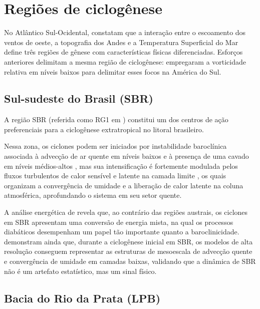 
\section{Regiões de ciclogênese}\label{sec:tb_regiones}
No Atlântico Sul-Ocidental, \citet{gramcianinov2019properties} constatam que a interação entre o escoamento dos ventos de oeste, a topografia dos Andes e a Temperatura Superficial do Mar define três regiões de gênese com características físicas diferenciadas. Esforços anteriores delimitam a mesma região de ciclogênese: \citet{reboita2010south} empregaram a vorticidade relativa em níveis baixos para delimitar esses focos na América do Sul.

\subsection{Sul-sudeste do Brasil (SBR)}\label{subsec:tb_sbr}

A região SBR (referida como RG1 em \citet{reboita2022from}) constitui um dos centros de ação preferenciais para a ciclogênese extratropical no litoral brasileiro.

Nessa zona, os ciclones podem ser iniciados por instabilidade baroclínica associada à advecção de ar quente em níveis baixos e à presença de uma cavado em níveis médios-altos \citep{gozzo2014subtropical}, mas sua intensificação é fortemente modulada pelos fluxos turbulentos de calor sensível e latente na camada limite \citep{gozzo2013air}, os quais organizam a convergência de umidade e a liberação de calor latente na coluna atmosférica, aprofundando o sistema em seu setor quente.

A análise energética de \citet{coutodesouza2024thesis} revela que, ao contrário das regiões austrais, os ciclones em SBR apresentam uma conversão de energia mista, na qual os processos diabáticos desempenham um papel tão importante quanto a baroclinicidade. \citet{gramcianinov2024early} demonstram ainda que, durante a ciclogênese inicial em SBR, os modelos de alta resolução conseguem representar as estruturas de mesoescala de advecção quente e convergência de umidade em camadas baixas, validando que a dinâmica de SBR não é um artefato estatístico, mas um sinal físico.

\subsection{Bacia do Rio da Prata (LPB)}\label{subsec:tb_lpb}

